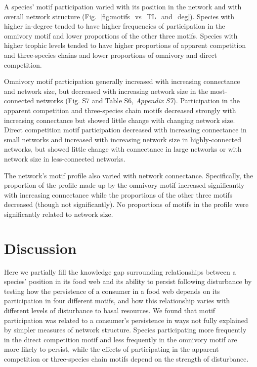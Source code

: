 \documentclass[12pt]{article}
\begin{document}
\begin{spacing}{2.0}
        A species' motif participation varied with its position in the network and with overall network structure (Fig.~\ref{fig:motifs_vs_TL_and_deg}).
        Species with higher in-degree tended to have higher frequencies of participation in the omnivory motif and lower proportions of the other three motifs.
        Species with higher trophic levels tended to have higher proportions of apparent competition and three-species chains and lower proportions of omnivory and direct competition. 
        
        
        Omnivory motif participation generally increased with increasing connectance and network size, but decreased with increasing network size in the most-connected networks (Fig. S7 and Table S6, \emph{Appendix S7}).
        Participation in the apparent competition and three-species chain motifs decreased strongly with increasing connectance but showed little change with changing network size.
        Direct competition motif participation decreased with increasing connectance in small networks and increased with increasing network size in highly-connected networks, but showed little change with connectance in large networks or with network size in less-connected networks.

        
        The network's motif profile also varied with network connectance.
        Specifically, the proportion of the profile made up by the omnivory motif increased significantly  with increasing connectance while the proportions of the other three motifs decreased (though not significantly).
        No proportions of motifs in the profile were significantly related to network size.


\section*{Discussion}
    
    Here we partially fill the knowledge gap surrounding relationships between a species' position in its food web and its ability to persist following disturbance by testing how the persistence of a consumer in a food web depends on its participation in four different motifs, and how this relationship varies with different levels of disturbance to basal resources. 
    We found that motif participation was related to a consumer's persistence in ways not fully explained by simpler measures of network structure. 
    Species participating more frequently in the direct competition motif and less frequently in the omnivory motif are more likely to persist, while the effects of participating in the apparent competition or three-species chain motifs depend on the strength of disturbance.



\end{spacing}
\end{document}
